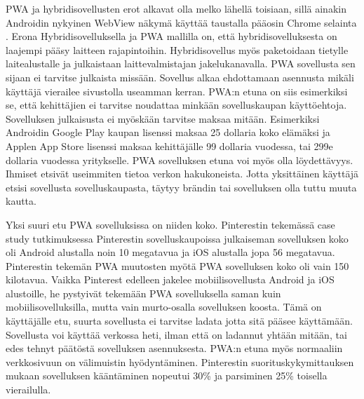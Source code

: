 \documentclass{tktltiki}
\begin{document}
PWA ja hybridisovellusten erot alkavat olla melko lähellä toisiaan, sillä ainakin Androidin nykyinen WebView näkymä käyttää taustalla pääosin Chrome selainta \cite{Crosswalk}. Erona Hybridisovelluksella ja PWA mallilla on, että hybridisovelluksesta on laajempi pääsy laitteen rajapintoihin. Hybridisovellus myös paketoidaan tietylle laitealustalle ja julkaistaan laittevalmistajan jakelukanavalla. PWA sovellusta sen sijaan ei tarvitse julkaista missään. Sovellus alkaa ehdottamaan asennusta mikäli käyttäjä vierailee sivustolla useamman kerran. PWA:n etuna on siis esimerkiksi se, että kehittäjien ei tarvitse noudattaa minkään sovelluskaupan käyttöehtoja. Sovelluksen julkaisusta ei myöskään tarvitse maksaa mitään. Esimerkiksi Androidin Google Play kaupan lisenssi maksaa 25 dollaria koko elämäksi ja Applen App Store lisenssi maksaa kehittäjälle 99 dollaria vuodessa, tai 299e dollaria vuodessa yritykselle. PWA sovelluksen etuna voi myös olla löydettävyys. Ihmiset etsivät useimmiten tietoa verkon hakukoneista. Jotta yksittäinen käyttäjä etsisi sovellusta sovelluskaupasta, täytyy brändin tai sovelluksen olla tuttu muuta kautta. 

Yksi suuri etu PWA sovelluksissa on niiden koko. Pinterestin tekemässä case study tutkimuksessa \cite{Osmani} Pinterestin sovelluskaupoissa julkaiseman sovelluksen koko oli Android alustalla noin 10 megatavua ja iOS alustalla jopa 56 megatavua. Pinterestin tekemän PWA muutosten myötä PWA sovelluksen koko oli vain 150 kilotavua. Vaikka Pinterest edelleen jakelee mobiilisovellusta Android ja iOS alustoille, he pystyivät tekemään PWA sovelluksella saman kuin mobiilisovelluksilla, mutta vain murto-osalla sovelluksen koosta. Tämä on käyttäjälle etu, suurta sovellusta ei tarvitse ladata jotta sitä pääsee käyttämään. Sovellusta voi käyttää verkossa heti, ilman että on ladannut yhtään mitään, tai edes tehnyt päätöstä sovelluksen asennuksesta. PWA:n etuna myös normaaliin verkkosivuun on välimuistin hyödyntäminen. Pinterestin suorituskykymittauksen mukaan sovelluksen kääntäminen nopeutui 30\% ja parsiminen 25\% toisella vierailulla.  

\clearpage
\end{document}
